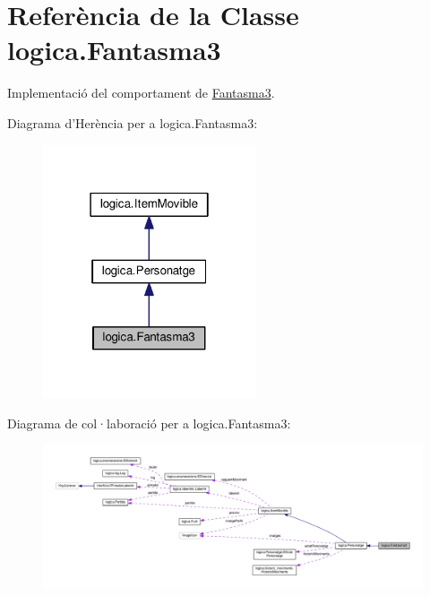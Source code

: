\hypertarget{classlogica_1_1_fantasma3}{\section{Referència de la Classe logica.\+Fantasma3}
\label{classlogica_1_1_fantasma3}
}


Implementació del comportament de \hyperlink{classlogica_1_1_fantasma3}{Fantasma3}.  




Diagrama d'Herència per a logica.\+Fantasma3\+:\nopagebreak
\begin{figure}[H]
\begin{center}
\leavevmode
\includegraphics[width=178pt]{classlogica_1_1_fantasma3__inherit__graph}
\end{center}
\end{figure}


Diagrama de col·laboració per a logica.\+Fantasma3\+:
\nopagebreak
\begin{figure}[H]
\begin{center}
\leavevmode
\includegraphics[width=350pt]{classlogica_1_1_fantasma3__coll__graph}
\end{center}
\end{figure}
